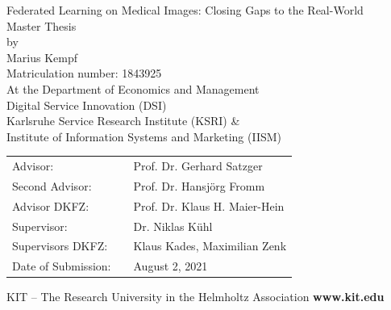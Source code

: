 \begin{titlepage}
\vspace*{0.5cm}
\begin{center}
		\Huge{Federated Learning on Medical Images: Closing Gaps to the Real-World}
		\vspace*{1.0cm}\\
		\Large{Master Thesis}\\
		\Large{by}\\
		\vspace*{0.5cm}
		\huge{Marius Kempf}\\
		\large{Matriculation number: 1843925}\\
		\vspace*{0.5cm}
		\Large{
			At the Department of Economics and Management
			\\ \vspace*{0.75cm}
			Digital Service Innovation (DSI)
			\\ \vspace*{0.5cm}
			Karlsruhe Service Research Institute (KSRI) \& \\
			Institute of Information Systems and Marketing (IISM)
		}
	\end{center}
	\vspace*{0.25cm}
\Large{
\begin{center}
\begin{tabular}[ht]{l c l}
  Advisor:          & \hfill    & Prof. Dr. Gerhard Satzger \\
  Second Advisor:   & \hfill    & Prof. Dr. Hansj\"org Fromm \\
  Advisor DKFZ:     & \hfill    & Prof. Dr. Klaus H. Maier-Hein \\
  Supervisor:       & \hfill    & Dr. Niklas K\"uhl \\
  Supervisors DKFZ: & \hfill    & Klaus Kades, Maximilian Zenk \\
  Date of Submission:  & \hfill & August 2, 2021 \\
\end{tabular}
\end{center}
}


\vspace*{1.0cm}
	\tiny{KIT -- The Research University in the Helmholtz Association} \hfill \small{\textbf{www.kit.edu} }
\end{titlepage}
